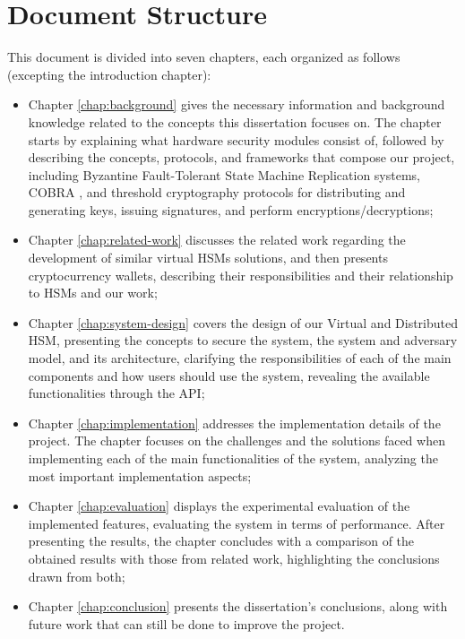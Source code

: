 \section{Document Structure}
This document is divided into seven chapters, each organized as follows (excepting the introduction chapter):
\begin{itemize}
	\item Chapter \ref{chap:background} gives the necessary information and background knowledge related to the concepts this dissertation focuses on. The chapter starts by explaining what hardware security modules consist of, followed by describing the concepts, protocols, and frameworks that compose our project, including Byzantine Fault-Tolerant State Machine Replication systems, COBRA \cite{cobra}, and threshold cryptography protocols for distributing and generating keys, issuing signatures, and perform encryptions/decryptions; 
	\item Chapter \ref{chap:related-work} discusses the related work regarding the development of similar virtual HSMs solutions, and then presents cryptocurrency wallets, describing their responsibilities and their relationship to HSMs and our work;
	\item Chapter \ref{chap:system-design} covers the design of our Virtual and Distributed HSM, presenting the concepts to secure the system, the system and adversary model, and its architecture, clarifying the responsibilities of each of the main components and how users should use the system, revealing the available functionalities through the API;
	\item Chapter \ref{chap:implementation} addresses the implementation details of the project. The chapter focuses on the challenges and the solutions faced when implementing each of the main functionalities of the system, analyzing the most important implementation aspects; 
	\item Chapter \ref{chap:evaluation} displays the experimental evaluation of the implemented features, evaluating the system in terms of performance. After presenting the results, the chapter concludes with a comparison of the obtained results with those from related work, highlighting the conclusions drawn from both;  %
	\item Chapter \ref{chap:conclusion} presents the dissertation's conclusions, along with future work that can still be done to improve the project.
\end{itemize}
